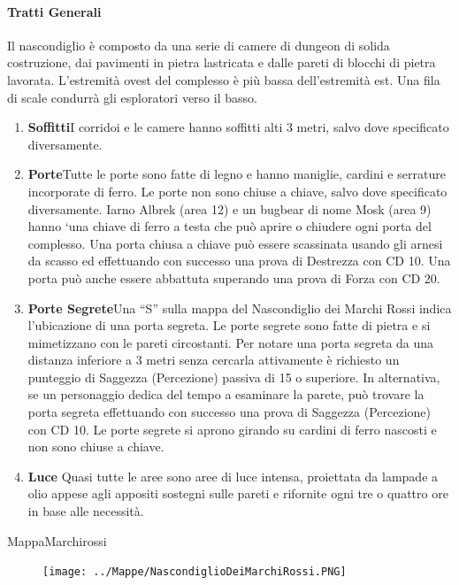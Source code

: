 \documentclass{article}
\begin{document}
\paragraph{Tratti Generali}
\hypertarget{trattigen}{}
Il nascondiglio è composto da una serie di camere di dungeon
di solida costruzione, dai pavimenti in pietra lastricata e
dalle pareti di blocchi di pietra lavorata. L'estremità ovest
del complesso è più bassa dell’estremità est. Una fila di scale
condurrà gli esploratori verso il basso.
\begin{enumerate}
    \item \textbf{Soffitti}I corridoi e le camere hanno soffitti alti 3 metri,
salvo dove specificato diversamente.
    \item \textbf{Porte}Tutte le porte sono fatte di legno e hanno maniglie,
cardini e serrature incorporate di ferro. Le porte non sono
chiuse a chiave, salvo dove specificato diversamente. Iarno
Albrek (area 12) e un bugbear di nome Mosk (area 9) hanno
‘una chiave di ferro a testa che può aprire o chiudere ogni
porta del complesso.
Una porta chiusa a chiave può essere scassinata usando
gli arnesi da scasso ed effettuando con successo una prova di
Destrezza con CD 10. Una porta può anche essere abbattuta
superando una prova di Forza con CD 20.
\item \textbf{Porte Segrete}Una “S” sulla mappa del Nascondiglio dei
Marchi Rossi indica l'ubicazione di una porta segreta.
Le porte segrete sono fatte di pietra e si mimetizzano con
le pareti circostanti. Per notare una porta segreta da una
distanza inferiore a 3 metri senza cercarla attivamente è
richiesto un punteggio di Saggezza (Percezione) passiva di
15 o superiore. In alternativa, se un personaggio dedica del
tempo a esaminare la parete, può trovare la porta segreta
effettuando con successo una prova di Saggezza (Percezione)
con CD 10. Le porte segrete si aprono girando su cardini di
ferro nascosti e non sono chiuse a chiave.
\item \textbf{Luce} Quasi tutte le aree sono aree di luce intensa, proiettata
da lampade a olio appese agli appositi sostegni sulle pareti e
rifornite ogni tre o quattro ore in base alle necessità.
\end{enumerate}
\hypertarget{MappaMarchirossi}{MappaMarchirossi}
\begin{figure}[ht]
        \texttt{[image: ../Mappe/NascondiglioDeiMarchiRossi.PNG]}
\end{figure}
\end{document}
